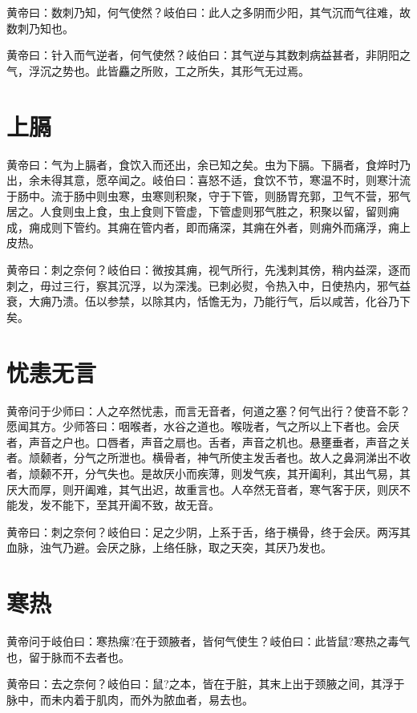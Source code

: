 \documentclass[12pt,UTF8]{ctexbook}
\begin{document}
	黄帝曰：数刺乃知，何气使然？岐伯曰：此人之多阴而少阳，其气沉而气往难，故数刺乃知也。
	
	黄帝曰：针入而气逆者，何气使然？岐伯曰：其气逆与其数刺病益甚者，非阴阳之气，浮沉之势也。此皆麤之所败，工之所失，其形气无过焉。
	
	\chapter{上膈}
		
	黄帝曰：气为上膈者，食饮入而还出，余已知之矣。虫为下膈。下膈者，食焠时乃出，余未得其意，愿卒闻之。岐伯曰：喜怒不适，食饮不节，寒温不时，则寒汁流于肠中。流于肠中则虫寒，虫寒则积聚，守于下管，则肠胃充郭，卫气不营，邪气居之。人食则虫上食，虫上食则下管虚，下管虚则邪气胜之，积聚以留，留则痈成，痈成则下管约。其痈在管内者，即而痛深，其痈在外者，则痈外而痛浮，痈上皮热。
	
	黄帝曰：刺之奈何？岐伯曰：微按其痈，视气所行，先浅刺其傍，稍内益深，逐而刺之，毋过三行，察其沉浮，以为深浅。已刺必熨，令热入中，日使热内，邪气益衰，大痈乃溃。伍以参禁，以除其内，恬憺无为，乃能行气，后以咸苦，化谷乃下矣。
	
	\chapter{忧恚无言}
	
	黄帝问于少师曰：人之卒然忧恚，而言无音者，何道之塞？何气出行？使音不彰？愿闻其方。少师答曰：咽喉者，水谷之道也。喉咙者，气之所以上下者也。会厌者，声音之户也。口唇者，声音之扇也。舌者，声音之机也。悬壅垂者，声音之关者。颃颡者，分气之所泄也。横骨者，神气所使主发舌者也。故人之鼻洞涕出不收者，颃颡不开，分气失也。是故厌小而疾薄，则发气疾，其开阖利，其出气易，其厌大而厚，则开阖难，其气出迟，故重言也。人卒然无音者，寒气客于厌，则厌不能发，发不能下，至其开阖不致，故无音。
	
	黄帝曰：刺之奈何？岐伯曰：足之少阴，上系于舌，络于横骨，终于会厌。两泻其血脉，浊气乃避。会厌之脉，上络任脉，取之天突，其厌乃发也。
	
	\chapter{寒热}
	
	黄帝问于岐伯曰：寒热瘰?在于颈腋者，皆何气使生？岐伯曰：此皆鼠?寒热之毒气也，留于脉而不去者也。
	
	黄帝曰：去之奈何？岐伯曰：鼠?之本，皆在于脏，其末上出于颈腋之间，其浮于脉中，而未内着于肌肉，而外为脓血者，易去也。
	
\end{document}
